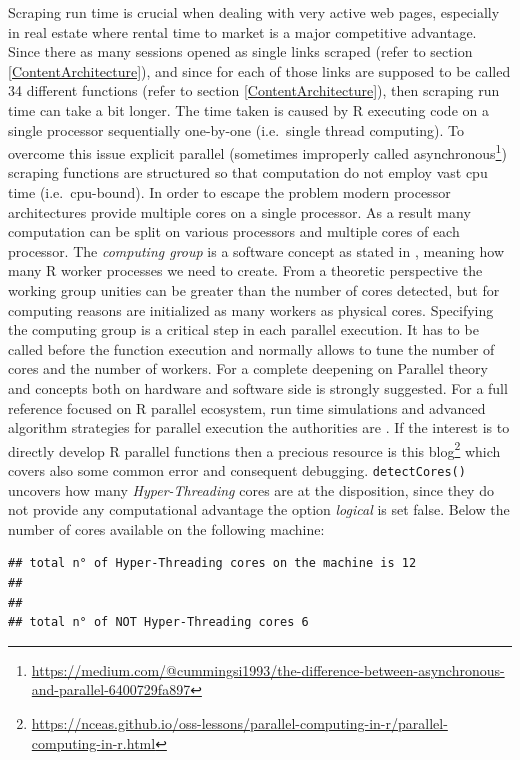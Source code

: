 \documentclass[
  12pt,
  a4paper,
  oneside]{book}
\DeclareRobustCommand{\href}[2]{#2\footnote{\url{#1}}}
\theoremstyle{definition}
\theoremstyle{definition}
\theoremstyle{definition}
\theoremstyle{remark}
\begin{document}
Scraping run time is crucial when dealing with very active web pages, especially in real estate where rental time to market is a major competitive advantage.
Since there as many sessions opened as single links scraped (refer to section \ref{ContentArchitecture}), and since for each of those links are supposed to be called 34 different functions (refer to section \ref{ContentArchitecture}), then scraping run time can take a bit longer. The time taken is caused by R executing code on a single processor sequentially one-by-one (i.e.~single thread computing). To overcome this issue explicit parallel (sometimes improperly called \href{https://medium.com/@cummingsi1993/the-difference-between-asynchronous-and-parallel-6400729fa897}{asynchronous}) scraping functions are structured so that computation do not employ vast cpu time (i.e.~cpu-bound). In order to escape the problem modern processor architectures provide multiple cores on a single processor. As a result many computation can be split on various processors and multiple cores of each processor.
The \emph{computing group} is a software concept as stated in \citep{parallelr}, meaning how many R worker processes we need to create. From a theoretic perspective the working group unities can be greater than the number of cores detected, but for computing reasons are initialized as many workers as physical cores. Specifying the computing group is a critical step in each parallel execution. It has to be called before the function execution and normally allows to tune the number of cores and the number of workers.
For a complete deepening on Parallel theory and concepts both on hardware and software side \citet{barney} is strongly suggested. For a full reference focused on R parallel ecosystem, run time simulations and advanced algorithm strategies for parallel execution the authorities are \citep{parallelr}. If the interest is to directly develop R parallel functions then a precious resource is this \href{https://nceas.github.io/oss-lessons/parallel-computing-in-r/parallel-computing-in-r.html}{blog} which covers also some common error and consequent debugging.
\texttt{detectCores()} uncovers how many \emph{Hyper-Threading} cores are at the disposition, since they do not provide any computational advantage the option \emph{logical} is set false. Below the number of cores available on the following machine:

\begin{verbatim}
## total n° of Hyper-Threading cores on the machine is 12
## 
## 
## total n° of NOT Hyper-Threading cores 6
\end{verbatim}
\end{document}
